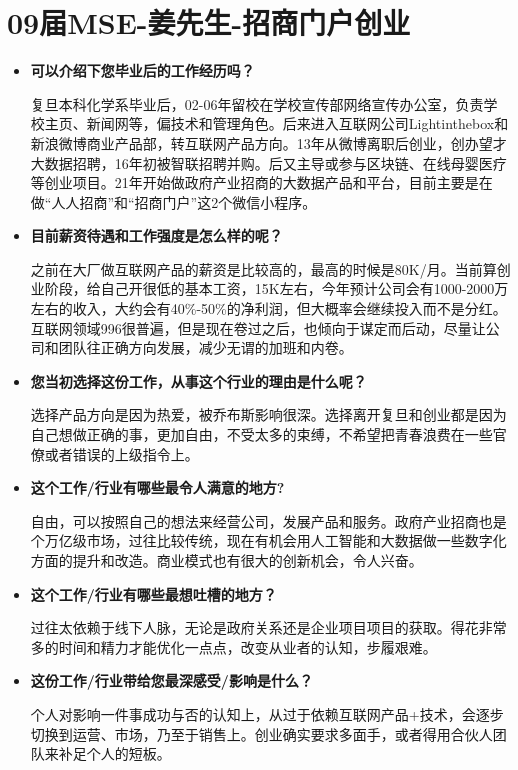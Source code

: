 \newpage
\section{09届MSE-姜先生-招商门户创业}
\begin{itemize}

\setlength{\parindent}{2em} 
    \item \textbf{可以介绍下您毕业后的工作经历吗？}

复旦本科化学系毕业后，02-06年留校在学校宣传部网络宣传办公室，负责学校主页、新闻网等，偏技术和管理角色。后来进入互联网公司Lightinthebox和新浪微博商业产品部，转互联网产品方向。13年从微博离职后创业，创办望才大数据招聘，16年初被智联招聘并购。后又主导或参与区块链、在线母婴医疗等创业项目。21年开始做政府产业招商的大数据产品和平台，目前主要是在做“人人招商”和“招商门户”这2个微信小程序。

    \item \textbf{目前薪资待遇和工作强度是怎么样的呢？}

之前在大厂做互联网产品的薪资是比较高的，最高的时候是80K/月。当前算创业阶段，给自己开很低的基本工资，15K左右，今年预计公司会有1000-2000万左右的收入，大约会有40\%-50\%的净利润，但大概率会继续投入而不是分红。互联网领域996很普遍，但是现在卷过之后，也倾向于谋定而后动，尽量让公司和团队往正确方向发展，减少无谓的加班和内卷。


    \item \textbf{您当初选择这份工作，从事这个行业的理由是什么呢？}

选择产品方向是因为热爱，被乔布斯影响很深。选择离开复旦和创业都是因为自己想做正确的事，更加自由，不受太多的束缚，不希望把青春浪费在一些官僚或者错误的上级指令上。

  
    \item \textbf{这个工作/行业有哪些最令人满意的地方?}

自由，可以按照自己的想法来经营公司，发展产品和服务。政府产业招商也是个万亿级市场，过往比较传统，现在有机会用人工智能和大数据做一些数字化方面的提升和改造。商业模式也有很大的创新机会，令人兴奋。


    \item \textbf{这个工作/行业有哪些最想吐槽的地方？}

过往太依赖于线下人脉，无论是政府关系还是企业项目项目的获取。得花非常多的时间和精力才能优化一点点，改变从业者的认知，步履艰难。

    \item \textbf{这份工作/行业带给您最深感受/影响是什么？}

个人对影响一件事成功与否的认知上，从过于依赖互联网产品+技术，会逐步切换到运营、市场，乃至于销售上。创业确实要求多面手，或者得用合伙人团队来补足个人的短板。


\end{itemize}
